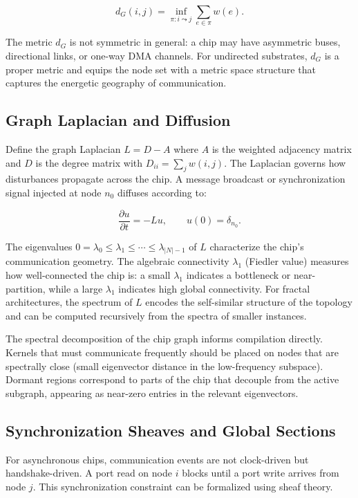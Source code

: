 \documentclass[11pt, a4paper]{article}
\begin{document}
\[
d_G(i,j) = \inf_{\pi: i \leadsto j} \sum_{e \in \pi} w(e).
\]

The metric $d_G$ is not symmetric in general: a chip may have asymmetric buses,
directional links, or one-way DMA channels. For undirected substrates, $d_G$
is a proper metric and equips the node set with a metric space structure that
captures the energetic geography of communication.

\subsection{Graph Laplacian and Diffusion}

Define the graph Laplacian $L = D - A$ where $A$ is the weighted adjacency matrix
and $D$ is the degree matrix with $D_{ii} = \sum_j w(i,j)$. The Laplacian governs
how disturbances propagate across the chip. A message broadcast or synchronization
signal injected at node $n_0$ diffuses according to:

\[
\frac{\partial u}{\partial t} = -Lu, \qquad u(0) = \delta_{n_0}.
\]

The eigenvalues $0 = \lambda_0 \leq \lambda_1 \leq \cdots \leq \lambda_{|N|-1}$
of $L$ characterize the chip's communication geometry. The algebraic connectivity
$\lambda_1$ (Fiedler value) measures how well-connected the chip is: a small
$\lambda_1$ indicates a bottleneck or near-partition, while a large $\lambda_1$
indicates high global connectivity. For fractal architectures, the spectrum
of $L$ encodes the self-similar structure of the topology and can be computed
recursively from the spectra of smaller instances.

The spectral decomposition of the chip graph informs compilation directly. Kernels
that must communicate frequently should be placed on nodes that are spectrally
close (small eigenvector distance in the low-frequency subspace). Dormant regions
correspond to parts of the chip that decouple from the active subgraph, appearing
as near-zero entries in the relevant eigenvectors.

\subsection{Synchronization Sheaves and Global Sections}

For asynchronous chips, communication events are not clock-driven but
handshake-driven. A port read on node $i$ blocks until a port write arrives from
node $j$. This synchronization constraint can be formalized using sheaf theory.
\end{document}
